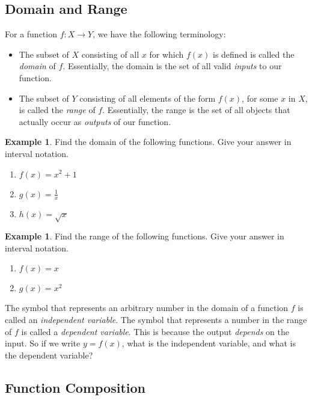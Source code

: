 \documentclass[letterpaper,12pt,oneside]{book}
\theoremstyle{definition}
\newtheorem{example}[theorem]{Example}
\newcommand{\dsp}{\displaystyle}
\begin{document}
{\subsection*{Domain and Range}

For a function $f:X\rightarrow Y$, we have the following terminology: 
\begin{itemize}
\item The subset of $X$ consisting of all $x$ for which $f(x)$ is defined is called the \emph{domain} of $f$.  Essentially, the domain is the set of all valid \emph{inputs} to our function.  
\item The subset of $Y$ consisting of all elements of the form $f(x)$, for some $x$ in $X$, is called the \emph{range} of $f$.  Essentially, the range is the set of all objects that actually occur as \emph{outputs} of our function. 
\end{itemize}

\begin{example}
Find the domain of the following functions.  Give your answer in interval notation.
\begin{enumerate}
\item $f(x)=x^2+1$
\vfill
\item $g(x)=\dsp\frac{1}{x}$
\vfill
\item $h(x)=\sqrt{x}$
\vfill
\end{enumerate}
\end{example}

\begin{example}
Find the range of the following functions.  Give your answer in interval notation.
\begin{enumerate}
\item $f(x)=x$
\vfill
\item $g(x)=x^2$
\vfill
\end{enumerate}
\end{example}

The symbol that represents an arbitrary number in the domain of a function $f$ is called an \emph{independent variable}.  The symbol that represents a number in the range of $f$ is called a \emph{dependent variable}.  This is because the output \emph{depends} on the input.  So if we write $y=f(x)$, what is the independent variable, and what is the dependent variable?


\newpage

\subsection*{Function Composition}

}
\end{document}
